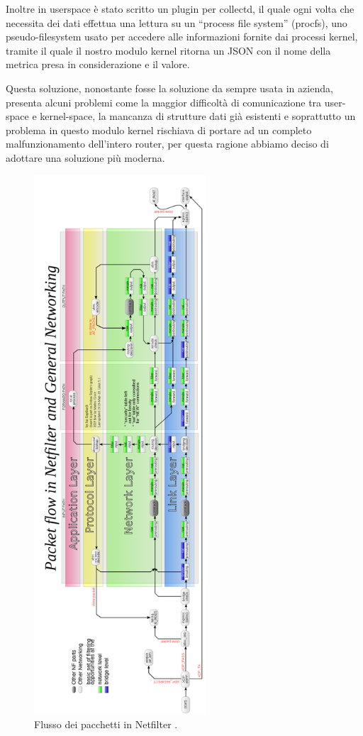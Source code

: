 Inoltre in userspace è stato scritto un plugin per collectd, il quale ogni volta che necessita dei dati effettua una lettura su un ``process file system'' (procfs), uno pseudo-filesystem usato per accedere alle informazioni fornite dai processi kernel, tramite il quale il nostro modulo kernel ritorna un JSON con il nome della metrica presa in considerazione e il valore.

Questa soluzione, nonostante fosse la soluzione da sempre usata in azienda, presenta alcuni problemi come la maggior difficoltà di comunicazione tra user-space e kernel-space, la mancanza di strutture dati già esistenti e soprattutto un problema in questo modulo kernel rischiava di portare ad un completo malfunzionamento dell'intero router, per questa ragione abbiamo deciso di adottare una soluzione più moderna.

\begin{figure}[hbtp]
    \label{fig:netfilter}
    \begin{center}
        \includegraphics[height=570pt]{images/mitigazione/netfilter.png}
    \end{center}

    \caption{Flusso dei pacchetti in Netfilter \cite{netfilter_img}.}
    \centering
\end{figure}  

